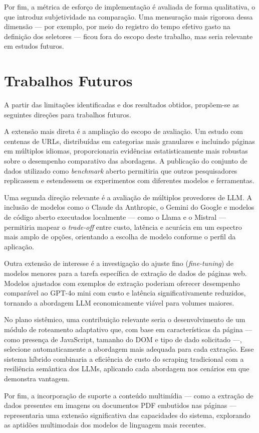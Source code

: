 \documentclass[tcc,capa]{texifsul}
\begin{document}
Por fim, a métrica de esforço de implementação é avaliada de forma qualitativa, o que introduz subjetividade na comparação. Uma mensuração mais rigorosa dessa dimensão — por exemplo, por meio do registro do tempo efetivo gasto na definição dos seletores — ficou fora do escopo deste trabalho, mas seria relevante em estudos futuros.

\section{Trabalhos Futuros}

A partir das limitações identificadas e dos resultados obtidos, propõem-se as seguintes direções para trabalhos futuros.

A extensão mais direta é a ampliação do escopo de avaliação. Um estudo com centenas de URLs, distribuídas em categorias mais granulares e incluindo páginas em múltiplos idiomas, proporcionaria evidências estatisticamente mais robustas sobre o desempenho comparativo das abordagens. A publicação do conjunto de dados utilizado como \textit{benchmark} aberto permitiria que outros pesquisadores replicassem e estendessem os experimentos com diferentes modelos e ferramentas.

Uma segunda direção relevante é a avaliação de múltiplos provedores de LLM. A inclusão de modelos como o Claude da Anthropic, o Gemini do Google e modelos de código aberto executados localmente — como o Llama e o Mistral — permitiria mapear o \textit{trade-off} entre custo, latência e acurácia em um espectro mais amplo de opções, orientando a escolha de modelo conforme o perfil da aplicação.

Outra extensão de interesse é a investigação do ajuste fino (\textit{fine-tuning}) de modelos menores para a tarefa específica de extração de dados de páginas web. Modelos ajustados com exemplos de extração poderiam oferecer desempenho comparável ao GPT-4o mini com custo e latência significativamente reduzidos, tornando a abordagem LLM economicamente viável para volumes maiores.

No plano sistêmico, uma contribuição relevante seria o desenvolvimento de um módulo de roteamento adaptativo que, com base em características da página — como presença de JavaScript, tamanho do DOM e tipo de dado solicitado —, selecione automaticamente a abordagem mais adequada para cada extração. Esse sistema híbrido combinaria a eficiência de custo do scraping tradicional com a resiliência semântica dos LLMs, aplicando cada abordagem nos cenários em que demonstra vantagem.

Por fim, a incorporação de suporte a conteúdo multimídia — como a extração de dados presentes em imagens ou documentos PDF embutidos nas páginas — representaria uma extensão significativa das capacidades do sistema, explorando as aptidões multimodais dos modelos de linguagem mais recentes.



\end{document}
